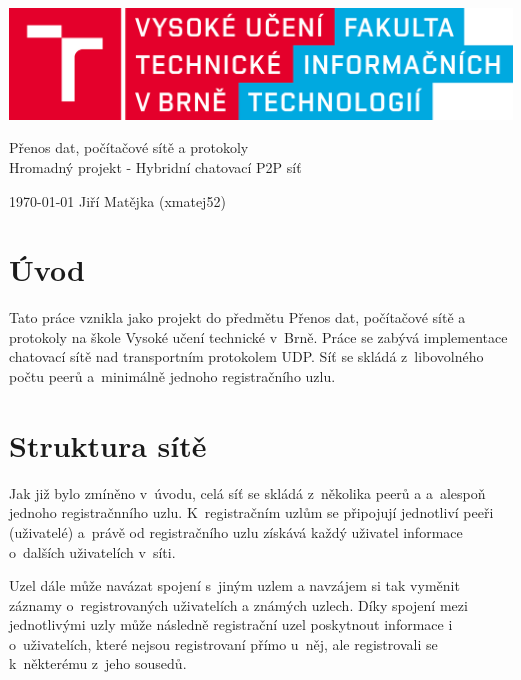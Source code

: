 \documentclass[11pt,a4paper,titlepage]{article}
\begin{document}
		\begin{center}

			\includegraphics[width = 150mm]{logo.png}\\


			\LARGE
			Přenos dat, počítačové sítě a protokoly\\
			Hromadný projekt - Hybridní chatovací P2P síť\\

		\end{center}

	\Large{\today} \hfill Jiří Matějka (xmatej52)
	\thispagestyle{empty}
	\newpage
	\setcounter{page}{1}

    \tableofcontents
	\newpage
	\newpage

    \section{Úvod} \label{uvod}
        Tato práce vznikla jako projekt do předmětu Přenos dat, počítačové sítě a protokoly na škole
		Vysoké učení technické v~Brně. Práce se zabývá implementace chatovací sítě nad transportním protokolem
        UDP. Síť se skládá z~libovolného počtu peerů a~minimálně jednoho registračního uzlu.

	\section{Struktura sítě} \label{struktura}
		Jak již bylo zmíněno v~úvodu, celá síť se skládá z~několika peerů a
        a~alespoň jednoho registračnního uzlu. K~registračním uzlům se připojují jednotliví peeři (uživatelé)
        a~právě od registračního uzlu získává každý uživatel informace o~dalších uživatelích v~síti.

        Uzel dále může navázat spojení s~jiným uzlem a navzájem si tak vyměnit záznamy
        o~registrovaných uživatelích a známých uzlech. Díky spojení mezi jednotlivými uzly
        může následně registrační uzel poskytnout informace i o~uživatelích, které nejsou
        registrovaní přímo u~něj, ale registrovali se k~některému z~jeho sousedů.
\end{document}
